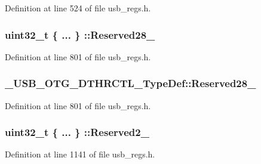 Definition at line 524 of file usb\-\_\-regs.\-h.

\hypertarget{group___u_s_b___o_t_g___d_r_i_v_e_r_ga0dd1bba19a2633e096eb699133f4c3f6}{
\subsubsection[{Reserved28\-\_\-31}]{\setlength{\rightskip}{0pt plus 5cm}uint32\-\_\-t \{ ... \} \-::Reserved28\-\_}}\label{group___u_s_b___o_t_g___d_r_i_v_e_r_ga0dd1bba19a2633e096eb699133f4c3f6}


Definition at line 801 of file usb\-\_\-regs.\-h.

\hypertarget{group___u_s_b___o_t_g___d_r_i_v_e_r_ga11a3281d786b50e552ccfc47d7de12b5}{
\subsubsection[{Reserved28\-\_\-31}]{ \-\_\-\-U\-S\-B\-\_\-\-O\-T\-G\-\_\-\-D\-T\-H\-R\-C\-T\-L\-\_\-\-Type\-Def\-::\-Reserved28\-\_}}\label{group___u_s_b___o_t_g___d_r_i_v_e_r_ga11a3281d786b50e552ccfc47d7de12b5}


Definition at line 801 of file usb\-\_\-regs.\-h.

\hypertarget{group___u_s_b___o_t_g___d_r_i_v_e_r_ga7bd7e155fe1f180f39747efdd353fc66}{
\subsubsection[{Reserved2\-\_\-3}]{\setlength{\rightskip}{0pt plus 5cm}uint32\-\_\-t \{ ... \} \-::Reserved2\-\_}}\label{group___u_s_b___o_t_g___d_r_i_v_e_r_ga7bd7e155fe1f180f39747efdd353fc66}


Definition at line 1141 of file usb\-\_\-regs.\-h.

